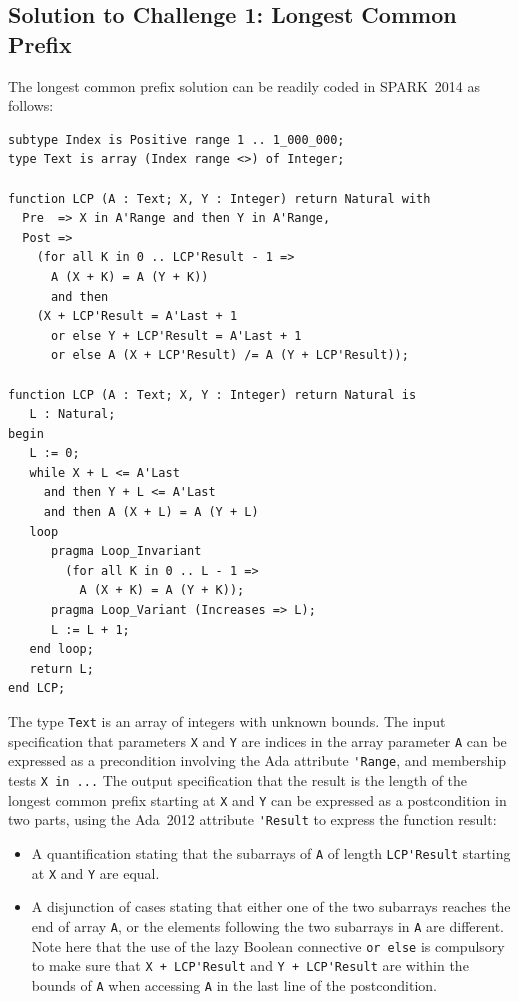 \documentclass[sttt,final]{svjour}
\newcommand{\newspark}{SPARK~2014\xspace}
\newcommand{\adatwtw}{Ada~2012\xspace}
\begin{document}
\subsection{Solution to Challenge 1: Longest Common Prefix}

The longest common prefix solution can be readily coded in \newspark
as follows:

\begin{lstlisting}
subtype Index is Positive range 1 .. 1_000_000;
type Text is array (Index range <>) of Integer;

function LCP (A : Text; X, Y : Integer) return Natural with
  Pre  => X in A'Range and then Y in A'Range,
  Post =>
    (for all K in 0 .. LCP'Result - 1 =>
      A (X + K) = A (Y + K))
      and then
    (X + LCP'Result = A'Last + 1
      or else Y + LCP'Result = A'Last + 1
      or else A (X + LCP'Result) /= A (Y + LCP'Result));

function LCP (A : Text; X, Y : Integer) return Natural is
   L : Natural;
begin
   L := 0;
   while X + L <= A'Last
     and then Y + L <= A'Last
     and then A (X + L) = A (Y + L)
   loop
      pragma Loop_Invariant
        (for all K in 0 .. L - 1 =>
          A (X + K) = A (Y + K));
      pragma Loop_Variant (Increases => L);
      L := L + 1;
   end loop;
   return L;
end LCP;
\end{lstlisting}

The type \verb|Text| is an array of integers with unknown bounds. The input
specification that parameters \verb|X| and \verb|Y| are indices in the array
parameter \verb|A| can be expressed as a precondition involving the Ada
attribute \verb|'Range|, and membership tests \verb|X in ...| The output
specification that the result is the length of the longest common prefix
starting at \verb|X| and \verb|Y| can be expressed as a postcondition in two
parts, using the \adatwtw attribute \verb|'Result| to express the function
result:
\begin{itemize}
\item A quantification stating that the subarrays of \verb|A| of length
  \verb|LCP'Result| starting at \verb|X| and \verb|Y| are equal.
\item A disjunction of cases stating that either one of the two
  subarrays reaches the end of array \verb|A|, or the elements
  following the two subarrays in \verb|A| are different. Note here
  that the use of the lazy Boolean connective \verb|or else| is
  compulsory to make sure that \verb|X + LCP'Result| and
  \verb|Y + LCP'Result| are within the bounds of \verb|A| when
  accessing \verb|A| in the last line of the postcondition.
\end{itemize}
\end{document}
